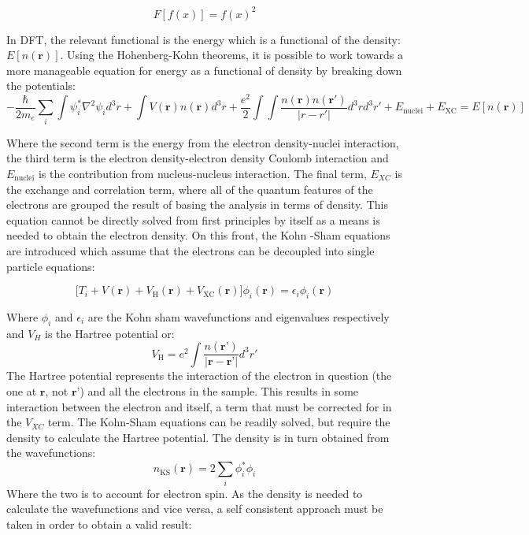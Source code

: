 \begin{equation}
F[f(x)] = f(x)^2 
\end{equation}

 In DFT, the relevant functional is the energy which is a functional of the density: $E[n(\textbf{r})]$.  Using the Hohenberg-Kohn theorems, it is possible to work towards a more manageable equation for energy as a functional of density by breaking down the potentials: 
\begin{equation}
-\frac{\hbar}{2m_e} \sum_{i} \int \psi_i^* \nabla^2\psi_id^3r + \int V(\textbf{r})n(\textbf{r})d^3r + \frac{e^2}{2} \int \int \frac{n(\textbf{r})n(\textbf{r}')}{|r-r'|}d^3r d^3r' + E_{\mathrm{nuclei}} + E_{\mathrm{XC}} = E[n(\textbf{r})]
\end{equation}

Where the second term is the energy from the electron density-nuclei interaction, the third term is the electron density-electron density Coulomb interaction and $E_{\mathrm{nuclei}}$ is the contribution from nucleus-nucleus interaction.  The final term, $E_{XC}$ is the exchange and correlation term, where all of the quantum features of the electrons are grouped the result of basing the analysis in terms of density. This equation cannot be directly solved from first principles by itself as a means is needed to obtain the electron density.  On this front, the Kohn -Sham equations are introduced which assume that the electrons can be decoupled into single particle equations: 

\begin{equation}
    \bigg[T_i + V(\textbf{r}) + V_{\mathrm{H}}(\textbf{r}) + V_{\mathrm{XC}}(\textbf{r})\bigg] \phi_i(\textbf{r}) = \epsilon_i \phi_i(\textbf{r})
    \label{ks_eq}
\end{equation}

Where $\phi_i$ and $\epsilon_i$ are the Kohn sham wavefunctions and eigenvalues respectively and $V_H$ is the Hartree potential or: 
\begin{equation}
    V_\mathrm{H} = e^2 \int \frac{n(\textbf{r'})}{|\textbf{r}-\textbf{r'}|}d^3r'
\end{equation}
The Hartree potential represents the interaction of the electron in question (the one at $\textbf{r}$, not $\textbf{r'}$) and all the electrons in the sample.  This results in some interaction between the electron and itself, a term that must be corrected for in the $V_{XC}$ term.  The Kohn-Sham equations can  be readily solved, but require the density to calculate the Hartree potential.  The density is in turn obtained from the wavefunctions: 
\begin{equation}
	n_{\mathrm{KS}}(\textbf{r}) = 2 \sum_{i} \phi_i^*\phi_i
	\label{KS_density}
\end{equation}
Where the two is to account for electron spin.  As the density is needed to calculate the wavefunctions and vice versa, a self consistent approach must be taken in order to obtain a valid result:  

